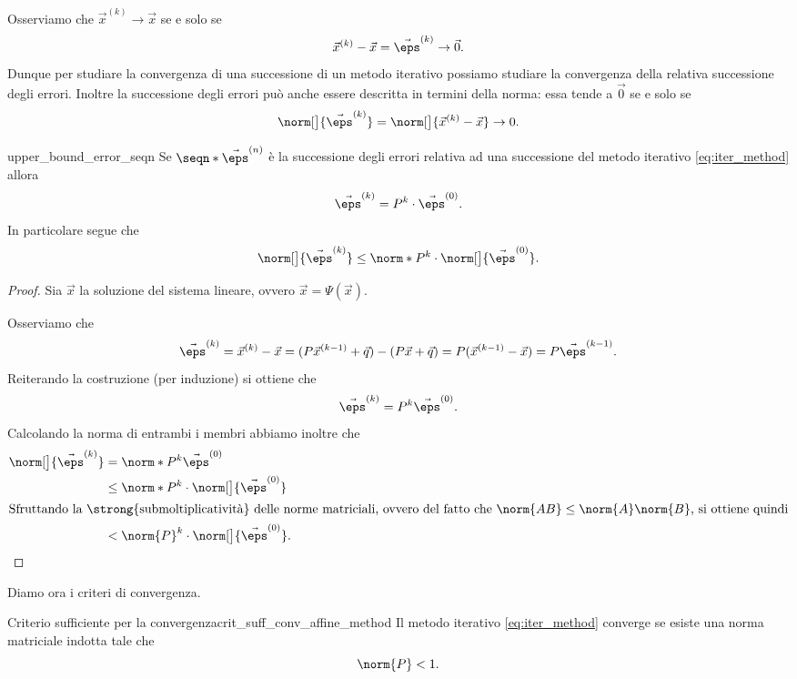 Osserviamo che $\vec x^{(k)} \to \vec x$ se e solo se \[
    \vec x^{(k)} - \vec x = \vec \eps^{(k)} \to \vec 0.
\] Dunque per studiare la convergenza di una successione di un metodo iterativo possiamo studiare la convergenza della relativa successione degli errori. Inoltre la successione degli errori può anche essere descritta in termini della norma: essa tende a $\vec 0$ se e solo se \[
    \norm[\big]{\vec \eps^{(k)}} = \norm[\big]{\vec x^{(k)} - \vec x} \to 0.
\]

\begin{lemma}{}{upper_bound_error_seqn}
    Se $\seqn*{\vec \eps^{(n)}}$ è la successione degli errori relativa ad una successione del metodo iterativo \eqref{eq:iter_method} allora \[
        \vec \eps^{(k)} = P^k \cdot \vec \eps^{(0)}.
    \] In particolare segue che \[
        \norm[\big]{\vec \eps^{(k)}} \leq \norm*{P}^k \cdot \norm[\big]{\vec \eps^{(0)}}.
    \]
\end{lemma}
\begin{proof}
    Sia $\vec x$ la soluzione del sistema lineare, ovvero $\vec x = \Psi(\vec x)$.
    
    Osserviamo che \[
        \vec \eps^{(k)} = \vec x^{(k)} - \vec x = (P\vec x^{(k-1)} + \vec q) - (P\vec x + \vec q) = P(\vec x^{(k-1)} - \vec x) = P\vec \eps^{(k-1)}.
    \] Reiterando la costruzione (per induzione) si ottiene che \[
        \vec \eps^{(k)} = P^k \vec \eps^{(0)}.
    \] Calcolando la norma di entrambi i membri abbiamo inoltre che \begin{align*}
        \norm[\big]{\vec \eps^{(k)}} 
        &= \norm*{P^k \vec \eps^{(0)}} \\
        &\leq \norm*{P^k} \cdot \norm[\big]{\vec \eps^{(0)}}\\
        \intertext{Sfruttando la \strong{submoltiplicatività} delle norme matriciali, ovvero del fatto che $\norm{AB} \leq \norm{A}\norm{B}$, si ottiene quindi} 
        &< \norm{P}^k \cdot \norm[\big]{\vec \eps^{(0)}}. \qedhere
    \end{align*}
\end{proof}

Diamo ora i criteri di convergenza.

\begin{theorem}
    {Criterio sufficiente per la convergenza}{crit_suff_conv_affine_method}
    Il metodo iterativo \eqref{eq:iter_method} converge se esiste una norma matriciale indotta tale che \[
        \norm{P} < 1.
    \]
\end{theorem}

